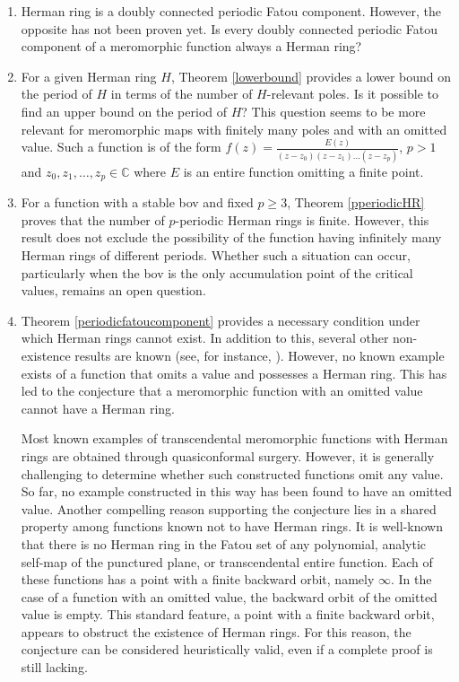 \documentclass[12pt]{article}
\begin{document}
\begin{enumerate}
	\item Herman ring is a doubly connected periodic Fatou component. However, the opposite has not been proven yet.  Is every doubly connected periodic Fatou component of a meromorphic function always a Herman ring?
	
	
	
	\item  For a given Herman ring $H$, Theorem \ref{lowerbound} provides a lower bound on the period of $H$ in terms of the number of $H$-relevant poles. Is it possible to find an upper bound on the period of $H$? This question seems to be more relevant for meromorphic maps with finitely many poles and with an omitted value. Such a function is of the form  $f(z)=\frac{E(z)}{(z-z_0)(z-z_1)...(z-z_p)}$, $p>1$ and $z_0, z_1,\dots, z_p \in \mathbb{C}$ where $E$ is an entire function omitting a finite point. 
	
	
	 \item For a function with a stable bov and fixed $p\geq 3$, Theorem \ref{pperiodicHR} proves that the number of $p$-periodic Herman rings is finite. However, this result does not exclude the possibility of the function having infinitely many Herman rings of different periods. Whether such a situation can occur, particularly when the bov is the only accumulation point of the critical values, remains an open question.
	
	
	
	
	
	
	
	
	\item Theorem \ref{periodicfatoucomponent} provides a necessary condition under which Herman rings cannot exist. In addition to this, several other non-existence results are known (see, for instance, \cite{tk, tk-zheng}). However, no known example exists of a function that omits a value and possesses a Herman ring. This has led to the conjecture that a meromorphic function with an omitted value cannot have a Herman ring.
	\par 	Most known examples of transcendental meromorphic functions with Herman rings are obtained through quasiconformal surgery. However, it is generally challenging to determine whether such constructed functions omit any value. So far, no example constructed in this way has been found to have an omitted value. Another compelling reason supporting the conjecture lies in a shared property among functions known not to have Herman rings. It is well-known that there is no Herman ring in the Fatou set of any polynomial, analytic self-map of the punctured plane, or transcendental entire function.  Each of these functions has a point with a finite backward orbit, namely $\infty$. In the case of a function with an omitted value, the backward orbit of the omitted value is empty. This standard feature, a point with a finite backward orbit, appears to obstruct the existence of Herman rings. For this reason, the conjecture can be considered heuristically valid, even if a complete proof is still lacking.
	
\end{enumerate}
\newpage


\end{document}
